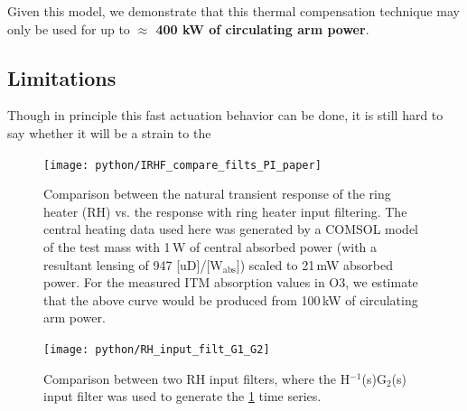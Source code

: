 \documentclass[colorlinks=true,pdfstartview=FitV,linkcolor=blue,
            citecolor=magenta,urlcolor=red]{ligodoc}
\begin{document}
Given this model, we demonstrate that this thermal compensation technique may only be used for up to \textbf{$\approx$ 400 kW of circulating arm power}.

\subsection{Limitations}
Though in principle this fast actuation behavior can be done, it is still hard to say whether it will be a strain to the 




\begin{figure}[H]
\texttt{[image: python/IRHF\_compare\_filts\_PI\_paper]} \label{fig:pipaperfig}
\caption{Comparison between the natural transient response of the ring heater (RH) vs. the response with ring heater input filtering. The central heating data used here was generated by a COMSOL model of the test mass with 1\,W of central absorbed power (with a resultant lensing of 947 [uD]/[W$_{\mathrm{abs}}$]) scaled to 21\,mW absorbed power. For the measured ITM absorption values in O3, we estimate that the above curve would be produced from 100\,kW of circulating arm power.}
\end{figure}



\begin{figure}[H]
\centering
\texttt{[image: python/RH\_input\_filt\_G1\_G2]}
\caption{Comparison between two RH input filters, where the H$^{-1}$(s)G$_2$(s) input filter was used to generate the \ref{fig:pipaperfig} time series.}
\end{figure}


\begin{thebibliography}{99}


\end{thebibliography}

\newpage
\end{document}
